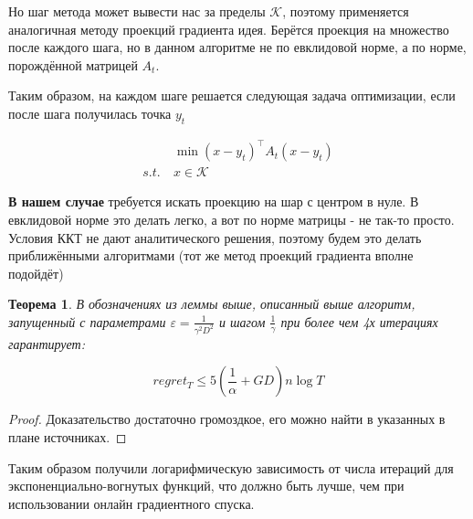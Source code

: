 \documentclass[12pt]{article}
\newtheorem*{theorem}{Теорема}
\theoremstyle{definition}
\begin{document}
Но шаг метода может вывести нас за пределы $\mathcal{K}$, поэтому применяется аналогичная методу проекций градиента идея. Берётся проекция на множество после каждого шага, но в данном алгоритме не по евклидовой норме, а по норме, порождённой матрицей $A_t$.

Таким образом, на каждом шаге решается следующая задача оптимизации, если после шага получилась точка $y_t$

\begin{align*}
&\min (x - y_t)^\top A_t(x - y_t) \\
s.t.\ & x \in \mathcal{K}
\end{align*}

\textbf{В нашем случае} требуется искать проекцию на шар с центром в нуле. В евклидовой норме это делать легко, а вот по норме матрицы - не так-то просто. Условия ККТ не дают аналитического решения, поэтому будем это делать приближёнными алгоритмами (тот же метод проекций градиента вполне подойдёт)

\begin{theorem}
В обозначениях из леммы выше, описанный выше алгоритм, запущенный с параметрами $\varepsilon = \frac{1}{\gamma^2 D^2}$ и шагом $\frac{1}{\gamma}$ при более чем 4х итерациях гарантирует:

$$ regret_T \leqslant 5(\frac{1}{\alpha} + GD) n \log T $$
\end{theorem}
	
\begin{proof}
	Доказательство достаточно громоздкое, его можно найти в указанных в плане источниках.
\end{proof}

Таким образом получили логарифмическую зависимость от числа итераций для экспоненциально-вогнутых функций, что должно быть лучше, чем при использовании онлайн градиентного спуска.
\end{document}
